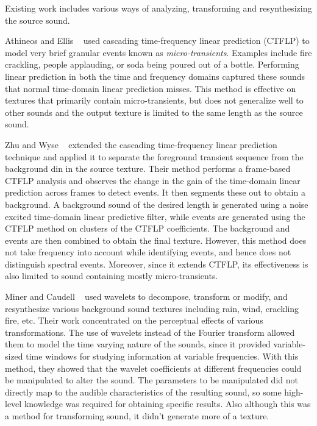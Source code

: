 \documentclass{acmsiggraph}               %
\begin{document}
Existing work includes various ways of analyzing, transforming and 
resynthesizing the source sound. 

Athineos and Ellis ~ used cascading time-frequency 
linear prediction (CTFLP) to model very brief granular events known as 
\textit{micro-transients}. Examples include fire crackling, people applauding, or 
soda being poured out of a bottle. Performing linear prediction in both the time and frequency 
domains captured these sounds that normal time-domain linear prediction misses. 
This method is effective on textures that primarily contain micro-transients, but does not
generalize well to other sounds and the output texture is limited to the same length as the 
source sound.

Zhu and Wyse ~ extended the cascading time-frequency 
linear prediction technique and applied it to separate the foreground 
transient sequence from the background din in the source texture. Their 
method performs a frame-based CTFLP analysis and observes the change in the gain of the 
time-domain linear prediction across frames to detect events. It then segments these 
out to obtain a background. A background sound of the desired length is generated using a 
noise excited time-domain linear predictive filter, while events are generated using the CTFLP 
method on clusters of the CTFLP coefficients. The background and events are then combined to 
obtain the final texture. However, this method does not take frequency into account while 
identifying events, and hence does not distinguish spectral events. Moreover, since it extends 
CTFLP, its effectiveness is also limited to sound containing mostly micro-transients.

Miner and Caudell ~ used wavelets to decompose, transform or modify,
and resynthesize various background sound textures including rain, wind, crackling fire, etc. 
Their work concentrated on the perceptual effects of various transformations.
The use of wavelets 
instead 
of the Fourier transform allowed them to model the time varying nature of the sounds, since 
it 
provided variable-sized time windows for studying information at variable frequencies. With 
this method, they showed that the wavelet coefficients at different frequencies could be 
manipulated to alter the sound. 
The parameters to be manipulated did 
not directly map to the audible characteristics of the resulting sound, so some high-level 
knowledge was required for obtaining specific results. Also although this was a method for 
transforming sound, it didn't generate more of a texture. 
\end{document}
